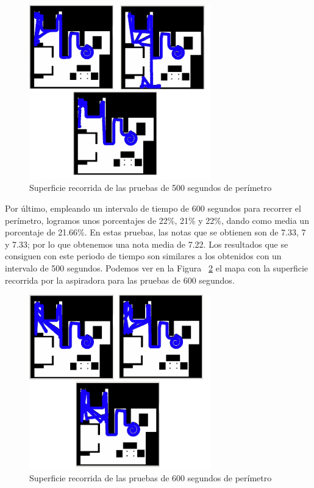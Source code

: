 \begin{figure}[H]
  \begin{center}
    \includegraphics[width=0.7\textwidth]{figures/Vacuum/Referee500.png}
		\caption{Superficie recorrida de las pruebas de 500 segundos de perímetro}
		\label{fig.Referee500}
		\end{center}
\end{figure}

Por último, empleando un intervalo de tiempo de 600 segundos para recorrer el perímetro, logramos unos porcentajes de 22\%, 21\% y 22\%, dando como media un porcentaje de 21.66\%. En estas pruebas, las notas que se obtienen son de 7.33, 7 y 7.33; por lo que obtenemos una nota media de 7.22. Los resultados que se consiguen con este periodo de tiempo son similares a los obtenidos con un intervalo de 500 segundos. Podemos ver en la Figura ~\ref{fig.Referee600} el mapa con la superficie recorrida por la aspiradora para las pruebas de 600 segundos. \\

\begin{figure}[H]
  \begin{center}
    \includegraphics[width=0.7\textwidth]{figures/Vacuum/Referee600.png}
		\caption{Superficie recorrida de las pruebas de 600 segundos de perímetro}
		\label{fig.Referee600}
		\end{center}
\end{figure}

